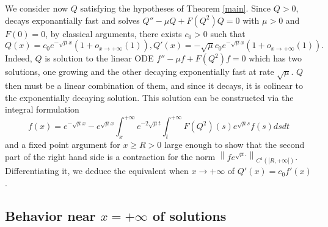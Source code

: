 \documentclass[11 pt]{amsart}
\theoremstyle{definition}
\theoremstyle{remark}
\numberwithin{equation}{section}
\begin{document}
We consider now $Q$ satisfying the hypotheses of Theorem \ref{main}. Since $Q>0$, decays exponantially fast and solves $Q'' - \mu Q + F (Q^2) Q = 0$ with $\mu > 0$ and $F
(0) = 0$, by classical arguments, there exists $c_0 > 0$ such
that
\begin{equation}
  Q (x) = c_0 e^{-\sqrt{\mu} x} (1 + o_{x \rightarrow
  + \infty} (1)),Q'(x)=-\sqrt{\mu}c_0 e^{-\sqrt{\mu} x} (1+o_{x \rightarrow
  + \infty} (1)). \label{kanine}
\end{equation}
Indeed, $Q$ is solution to the linear ODE $f''-\mu f+F(Q^2)f = 0$ which has two solutions, one growing and the other decaying exponentially fast at rate $\sqrt{\mu}$. $Q$ then must be a linear combination of them, and since it decays, it is colinear to the exponentially decaying solution.
This solution can be constructed via the integral
formulation
\begin{equation}
  f (x) = e^{- \sqrt{\mu} x} - e^{\sqrt{\mu} x} \int_x^{+ \infty} e^{- 2
  \sqrt{\mu} t} \int_t^{+ \infty} F (Q^2) (s) e^{\sqrt{\mu} s} f (s) d s d t
  \label{avb}
\end{equation}
and a fixed point argument for $x \geqslant R > 0$ large enough to show that
the second part of the right hand side is a contraction for the norm $\left\|
f e^{\sqrt{\mu} .} \right\|_{C^1 ([R, + \infty [)}$. Differentiating it, we
deduce the equivalent when $x \rightarrow + \infty$ of $Q' (x) = c_0 f'(x)$.

\subsection{Behavior near $x = + \infty$ of solutions}
\end{document}
